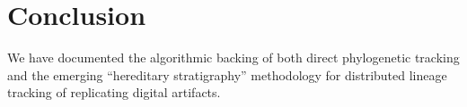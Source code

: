 \section{Conclusion} \label{sec:conclusion}



We have documented the algorithmic backing of both direct phylogenetic tracking and the emerging ``hereditary stratigraphy'' methodology for distributed lineage tracking of replicating digital artifacts.

